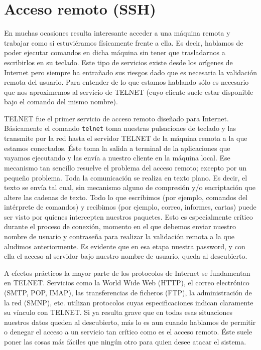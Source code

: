 \section{Acceso remoto (SSH)}

En muchas ocasiones resulta interesante acceder a una máquina remota y
trabajar como  si estuviéramos  físicamente frente  a ella.  Es decir,
hablamos de  poder ejecutar  comandos en dicha  máquina sin  tener que
trasladarnos  a escribirlos  en  su teclado.  Este  tipo de  servicios
existe desde  los orígenes de  Internet pero siempre ha  entrañado sus
riesgos dado que  es necesaria la validación remota  del usuario. Para
entender  de  lo  que  estamos  hablando sólo  es  necesario  que  nos
aproximemos al servicio de TELNET (cuyo cliente suele estar disponible
bajo el comando del mismo nombre).

TELNET fue el primer  servicio de acceso remoto diseñado
para  Internet.  Básicamente el  comando  {\tt  telnet} toma  nuestras
pulsaciones de  teclado y las transmite  por la red hasta  el servidor
TELNET de la máquina remota a  la que estamos conectados. Éste toma la
salida  a terminal  de la  aplicaciones que  vayamos ejecutando  y las
envía  a  nuestro cliente  en  la  máquina  local. Ese  mecanismo  tan
sencillo  resuelve  el problema  del  acceso  remoto; excepto  por  un
pequeño problema. Toda  la comunicación se realiza en  texto plano. Es
decir, el texto se envía tal  cual, sin mecanismo alguno de compresión
y/o  encriptación  que  altere  las  cadenas de  texto.  Todo  lo  que
escribimos  (por  ejemplo,  comandos  del intérprete  de  comandos)  y
recibimos (por ejemplo, correo, informes,  cartas) puede ser visto por
quienes intercepten  nuestros paquetes. Esto es  especialmente crítico
durante  el proceso  de conexión,  momento  en el  que debemos  enviar
nuestro nombre  de usuario  y contraseña  para realizar  la validación
remota a la  que aludimos anteriormente. Es evidente que  en esa etapa
nuestra password, y con ella el acceso al servidor bajo nuestro nombre
de usuario, queda al descubierto.

A   efectos  prácticos   la   mayor  parte   de   los  protocolos   de
Internet  se  fundamentan en  TELNET.  Servicios  como la  World  Wide
Web  (HTTP),  el   correo  electrónico  (SMTP,
POP,  IMAP),  las  transferencias  de  ficheros
(FTP), la administración de la red (SMNP), etc.
utilizan  protocolos  cuyas  especificaciones  indican  claramente  su
vínculo con TELNET. Si ya resulta  grave que en todas esas situaciones
nuestros datos queden al descubierto, más lo es aun cuando hablamos de
permitir o  denegar el  acceso a  un servicio tan  crítico como  es el
acceso remoto. Éste suele poner las  cosas más fáciles que ningún otro
para quien desee atacar el sistema.


